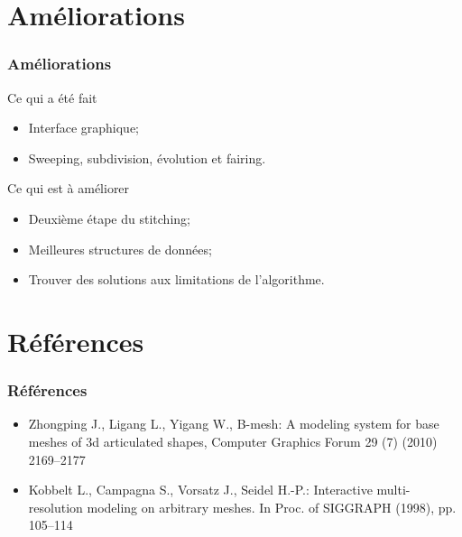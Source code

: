 \documentclass[9pt]{beamer}
\begin{document}
\section{Améliorations}
\begin{frame}
	\frametitle{Améliorations}
	
	\begin{block}{Ce qui a été fait}
		\begin{itemize}
			\item Interface graphique;
			\item Sweeping, subdivision, évolution et fairing.
		\end{itemize}
	\end{block}
	
	\begin{block}{Ce qui est à améliorer}
		\begin{itemize}
			\item Deuxième étape du stitching;
			\item Meilleures structures de données;
			\item Trouver des solutions aux limitations de l'algorithme.
		\end{itemize}
	\end{block}
\end{frame}


\section{Références}
\begin{frame}
	\frametitle{Références}
	\begin{itemize}
		\item  Zhongping J., Ligang L., Yigang W., B-mesh: A modeling system for base meshes of 3d articulated shapes, Computer 					Graphics Forum 29 (7) (2010) 2169–2177
		\item Kobbelt L., Campagna S., Vorsatz J., Seidel H.-P.: Interactive multi-resolution modeling on arbitrary meshes. In Proc. of SIGGRAPH (1998), pp. 105–114
	\end{itemize}
\end{frame}






\end{document}

